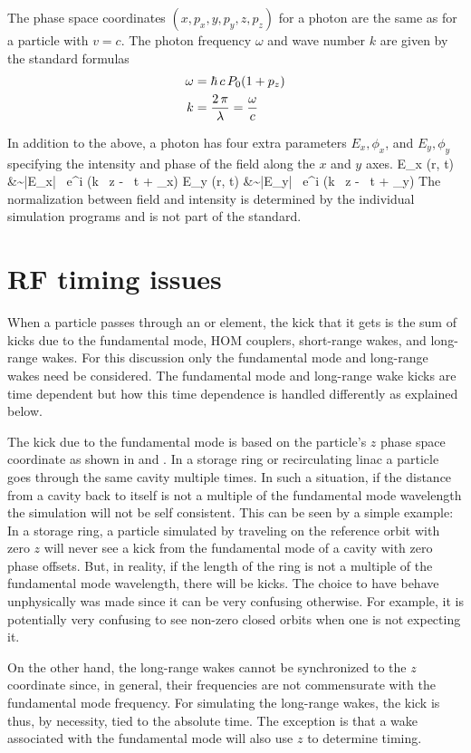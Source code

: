 The phase space coordinates $(x, p_x, y, p_y, z, p_z)$ for a photon
are the same as for a particle with $v = c$. The photon frequency $\omega$ and
wave number $k$ are given by the standard formulas
\begin{align}
  \omega &= \hbar \, c \, P_0 (1 + p_z) \nonumber \\
  k &= \frac{2 \, \pi}{\lambda} = \frac{\omega}{c}
\end{align}

In addition to the above, a photon has
four extra parameters $E_x, \phi_x$, and $E_y, \phi_y$ specifying the
intensity and phase of the field along the $x$ and $y$ axes.
\Begineqs
  E_x (\Bf r, t) &\sim |E_x| \, e^{i (k \, z - \omega \, t + \phi_x)} \CRNO
  E_y (\Bf r, t) &\sim |E_y| \, e^{i (k \, z - \omega \, t + \phi_y)} \CRNO
\Endeqs
The normalization between field and intensity is determined by the
individual simulation programs and is not part of the \bmad standard.

\section{RF timing issues}
\label{s:rf.time}

When a particle passes through an  or 
element, the kick that it gets is the sum of kicks due to the
fundamental mode, HOM couplers, short-range wakes, and long-range
wakes. For this discussion only the fundamental mode and long-range
wakes need be considered. The fundamental mode and long-range wake
kicks are time dependent but how this time dependence is handled 
differently as explained below.

The kick due to the fundamental mode is based on the particle's $z$
phase space coordinate as shown in  and . In a
storage ring or recirculating linac a particle goes through the same
cavity multiple times. In such a situation, if the distance from a
cavity back to itself is not a multiple of the fundamental mode
wavelength the simulation will not be self consistent. This can be
seen by a simple example: In a storage ring, a particle simulated by
\bmad traveling on the reference orbit with zero $z$ will never see a
kick from the fundamental mode of a cavity with zero phase
offsets. But, in reality, if the length of the ring is not a multiple
of the fundamental mode wavelength, there will be kicks. The choice to
have \bmad behave unphysically was made since it can be very confusing
otherwise. For example, it is potentially very confusing to see
non-zero closed orbits when one is not expecting it.

On the other hand, the long-range wakes cannot be synchronized to the
$z$ coordinate since, in general, their frequencies are not
commensurate with the fundamental mode frequency. For simulating the
long-range wakes, the kick is thus, by necessity, tied to the absolute
time. The exception is that a wake associated with the fundamental
mode will also use $z$ to determine timing.
